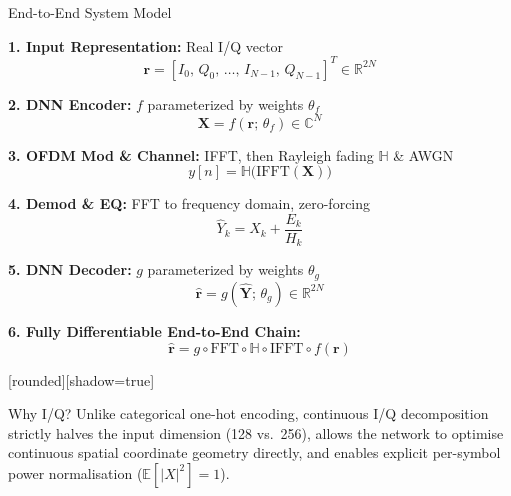 \documentclass[20pt]{beamer}
\begin{document}
\begin{frame}[t]{End-to-End System Model}

    \fontsize{13}{17}\selectfont
    \setlength{\abovedisplayskip}{3pt}
    \setlength{\belowdisplayskip}{3pt}
    \setlength{\parskip}{1pt}
    \vspace*{1.8in}

    \textbf{1. Input Representation:} Real I/Q vector
    \begin{equation*}
        \bm{r} = [I_0,\, Q_0,\, \dots,\, I_{N-1},\, Q_{N-1}]^T \in \mathbb{R}^{2N}
    \end{equation*}

    \textbf{2. DNN Encoder:} $f$ parameterized by weights $\theta_f$
    \begin{equation*}
        \bm{X} = f(\bm{r};\,\theta_f) \in \mathbb{C}^N
    \end{equation*}

    \textbf{3. OFDM Mod \& Channel:} IFFT, then Rayleigh fading $\mathbb{H}$ \& AWGN
    \begin{equation*}
        y[n] = \mathbb{H}\bigl(\mathrm{IFFT}(\bm{X})\bigr)
    \end{equation*}

    \textbf{4. Demod \& EQ:} FFT to frequency domain, zero-forcing
    \begin{equation*}
        \hat{Y}_k = X_k + \frac{E_k}{H_k}
    \end{equation*}

    \textbf{5. DNN Decoder:} $g$ parameterized by weights $\theta_g$
    \begin{equation*}
        \hat{\bm{r}} = g(\hat{\bm{Y}};\,\theta_g) \in \mathbb{R}^{2N}
    \end{equation*}

    \textbf{6. Fully Differentiable End-to-End Chain:}
    \begin{equation*}
        \hat{\bm{r}} = g \circ \mathrm{FFT} \circ \mathbb{H} \circ \mathrm{IFFT} \circ f(\bm{r})
    \end{equation*}

    \vspace{0.15in}
    [rounded][shadow=true]
    \begin{block}{Why I/Q?}
        Unlike categorical one-hot encoding, continuous I/Q decomposition strictly halves the input dimension (128 vs.\ 256), allows the network to optimise continuous spatial coordinate geometry directly, and enables explicit per-symbol power normalisation ($\mathbb{E}[|X|^2] = 1$).
    \end{block}

\end{frame}
\end{document}
